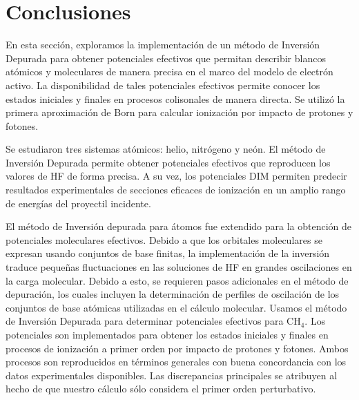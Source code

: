 \section{Conclusiones}
\label{conclusion}

En esta sección, exploramos la implementación de un método de Inversión
Depurada para obtener potenciales efectivos que permitan describir
blancos atómicos y moleculares de manera precisa en el marco del modelo 
de electrón activo. La disponibilidad de tales potenciales efectivos 
permite conocer los estados iniciales y finales en procesos colisonales 
de manera directa. Se utilizó la primera aproximación de Born para 
calcular ionización por impacto de protones y fotones. 

Se estudiaron tres sistemas atómicos: helio, nitrógeno y neón. El método 
de Inversión Depurada permite obtener potenciales efectivos que 
reproducen los valores de HF de forma precisa. A su vez, los potenciales
DIM permiten predecir resultados experimentales de secciones eficaces
de ionización en un amplio rango de energías del proyectil incidente.

El método de Inversión depurada para átomos fue extendido para la 
obtención de potenciales moleculares efectivos. Debido a que los 
orbitales moleculares se expresan usando conjuntos de base finitas, 
la implementación de la inversión traduce pequeñas fluctuaciones en las
soluciones de HF en grandes oscilaciones en la carga molecular.
Debido a esto, se requieren pasos adicionales en el método de depuración,
los cuales incluyen la determinación de perfiles de oscilación de los
conjuntos de base atómicas utilizadas en el cálculo molecular.
Usamos el método de Inversión Depurada para determinar potenciales
efectivos para CH$_4$. Los potenciales son implementados para obtener
los estados iniciales y finales en procesos de ionización a primer orden
por impacto de protones y fotones. Ambos procesos son reproducidos en 
términos generales con buena concordancia con los datos experimentales 
disponibles. Las discrepancias principales se atribuyen al hecho de 
que nuestro cálculo sólo considera el primer orden perturbativo.





